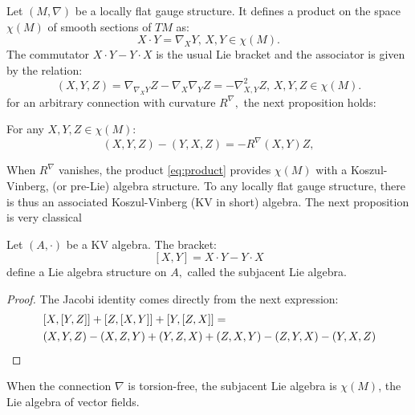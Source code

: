 Let $\left( M, \nabla \right)$ be a locally flat gauge structure. It defines a product on the space $\chi(M)$ of smooth sections of $TM$ as:
\begin{equation}
\label{eq:product}
    X \cdot Y = \nabla_X Y, \, X,Y \in \chi(M).
\end{equation}
The commutator $X\cdot Y - Y \cdot X$ is the usual Lie bracket and the associator is given by the relation:
\begin{equation}
    \label{eq:associator_nabla}
    \left( X, Y, Z \right) = \nabla_{\nabla_X Y} Z - \nabla_X \nabla_Y Z = - \nabla^2_{X,Y}Z, \, X, Y, Z \in \chi\left(M\right).
\end{equation}
for an arbitrary connection with curvature $R^\nabla,$ the next proposition holds:
\begin{prop}
\label{prop:kv_defect}
For any $X,Y,Z \in \chi\left(M\right):$
\begin{equation*}
\label{eq:kv_defect}
    \left( X, Y, Z \right) - \left( Y, X, Z \right) = - R^\nabla\left( X, Y \right) Z,
\end{equation*}
\end{prop}
When $R^\nabla$ vanishes, the product \ref{eq:product} provides $\chi(M)$ with a Koszul-Vinberg, (or pre-Lie) algebra structure. To any locally flat gauge structure, there is thus an associated Koszul-Vinberg (KV in short) algebra. The next proposition is very classical 
\begin{prop}
\label{prop:subjacent_lie}
Let $(A,\cdot)$ be a KV algebra. The bracket:
\begin{equation*}
\left [ X, Y \right ] = X \cdot Y - Y \cdot X
\end{equation*}
define a Lie algebra structure on $A,$ called the subjacent Lie algebra.
\end{prop}
\begin{proof}
The Jacobi identity comes directly from the next expression:
\begin{equation*}
    \begin{split}
        & \left [ X, \left [ Y, Z \right] \right] + \left [ Z, \left [ X, Y \right] \right] + \left [ Y, \left [ Z, X \right] \right] = \\
        & \left( X, Y , Z \right) - \left( X, Z , Y \right) + \left( Y, Z , X \right) 
         +\left( Z, X , Y \right) - \left( Z, Y , X \right) - \left( Y, X , Z \right)
    \end{split}
\end{equation*}
\end{proof}
\begin{rem}
When the connection $\nabla$ is torsion-free, the subjacent Lie algebra 
is $\chi(M)$, the Lie algebra of vector fields.
\end{rem}
